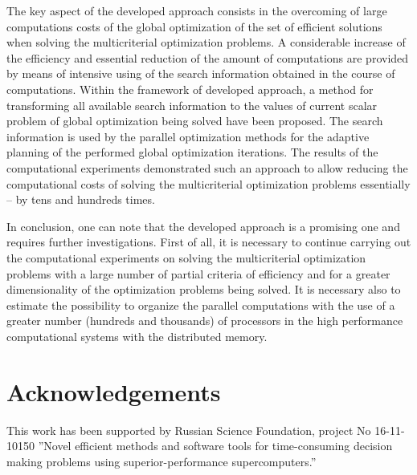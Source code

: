 \documentclass[procedia]{easychair}
\begin{document}
The key aspect of the developed approach consists in the overcoming of large computations costs of the global optimization of the set of efficient solutions when solving the multicriterial optimization problems. A considerable increase of the efficiency and essential reduction of the amount of computations are provided by means of intensive using of the search information obtained in the course of computations. Within the framework of developed approach, a method for transforming all available search information to the values of current scalar problem of global optimization being solved have been proposed. The search information is used by the parallel optimization methods for the adaptive planning of the performed global optimization iterations. The results of the computational experiments demonstrated such an approach to allow reducing the computational costs of solving the multicriterial optimization problems essentially -- by tens and hundreds times. \par

In conclusion, one can note that the developed approach is a promising one and requires further investigations. First of all, it is necessary to continue carrying out the computational experiments on solving the multicriterial optimization problems with a large number of partial criteria of efficiency and for a greater dimensionality of the optimization problems being solved. It is necessary also to estimate the possibility to organize the parallel computations with the use of a greater number (hundreds and thousands) of processors in the high performance computational systems with the distributed memory.


\section{Acknowledgements}
\label{sect:7}

This work has been supported by Russian Science Foundation, project No 16-11-10150 ''Novel efficient methods and software tools for time-consuming decision making problems using superior-performance supercomputers.''
%
\label{sect:bib}

%
%
%


\end{document}
